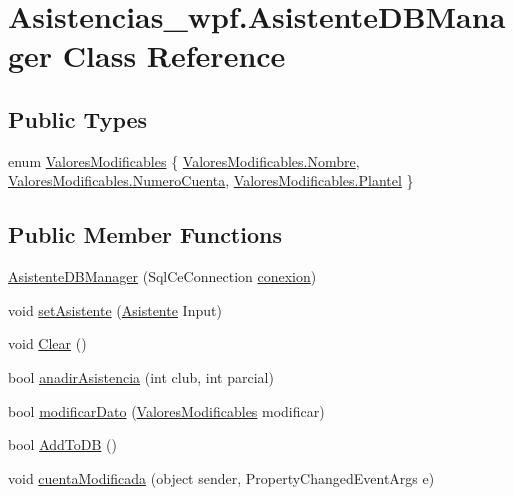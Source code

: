 \hypertarget{class_asistencias__wpf_1_1_asistente_d_b_manager}{\section{Asistencias\-\_\-wpf.\-Asistente\-D\-B\-Manager Class Reference}
\label{class_asistencias__wpf_1_1_asistente_d_b_manager}
}
\subsection*{Public Types}
\begin{DoxyCompactItemize}
\item 
enum \hyperlink{class_asistencias__wpf_1_1_asistente_d_b_manager_aeae46a91b8b2adb28f456244aacfb8f0}{Valores\-Modificables} \{ \hyperlink{class_asistencias__wpf_1_1_asistente_d_b_manager_aeae46a91b8b2adb28f456244aacfb8f0a4777bbaaa0aebe104606b77947d0e22d}{Valores\-Modificables.\-Nombre}, 
\hyperlink{class_asistencias__wpf_1_1_asistente_d_b_manager_aeae46a91b8b2adb28f456244aacfb8f0a7f670e8edeb7d1abac3f5695d74bb804}{Valores\-Modificables.\-Numero\-Cuenta}, 
\hyperlink{class_asistencias__wpf_1_1_asistente_d_b_manager_aeae46a91b8b2adb28f456244aacfb8f0a6e2cce6dad590a2367ae0285df2141a5}{Valores\-Modificables.\-Plantel}
 \}
\end{DoxyCompactItemize}
\subsection*{Public Member Functions}
\begin{DoxyCompactItemize}
\item 
\hyperlink{class_asistencias__wpf_1_1_asistente_d_b_manager_ac124c7e7f72b7eddbd4054da0d9169ad}{Asistente\-D\-B\-Manager} (Sql\-Ce\-Connection \hyperlink{class_asistencias__wpf_1_1_asistente_d_b_manager_a4ed268d53c358adfb5ca0185439bd6cf}{conexion})
\item 
void \hyperlink{class_asistencias__wpf_1_1_asistente_d_b_manager_a695b53193eabec4814e2a09a4811dba9}{set\-Asistente} (\hyperlink{class_asistencias__wpf_1_1_asistente}{Asistente} Input)
\item 
void \hyperlink{class_asistencias__wpf_1_1_asistente_d_b_manager_a1dc90dc3e9b1f2b0d5ac6997b23006d6}{Clear} ()
\item 
bool \hyperlink{class_asistencias__wpf_1_1_asistente_d_b_manager_a77d4dfd2794fde1c3ddc45e80ebf9a82}{anadir\-Asistencia} (int club, int parcial)
\item 
bool \hyperlink{class_asistencias__wpf_1_1_asistente_d_b_manager_a94c6e11567ec422e62c275ed6d2cacab}{modificar\-Dato} (\hyperlink{class_asistencias__wpf_1_1_asistente_d_b_manager_aeae46a91b8b2adb28f456244aacfb8f0}{Valores\-Modificables} modificar)
\item 
bool \hyperlink{class_asistencias__wpf_1_1_asistente_d_b_manager_a10556de1877fa8a45228425bd35ff83c}{Add\-To\-D\-B} ()
\item 
void \hyperlink{class_asistencias__wpf_1_1_asistente_d_b_manager_aaa8e1dc62ddda84ff70cc4477feef0c6}{cuenta\-Modificada} (object sender, Property\-Changed\-Event\-Args e)
\end{DoxyCompactItemize}
